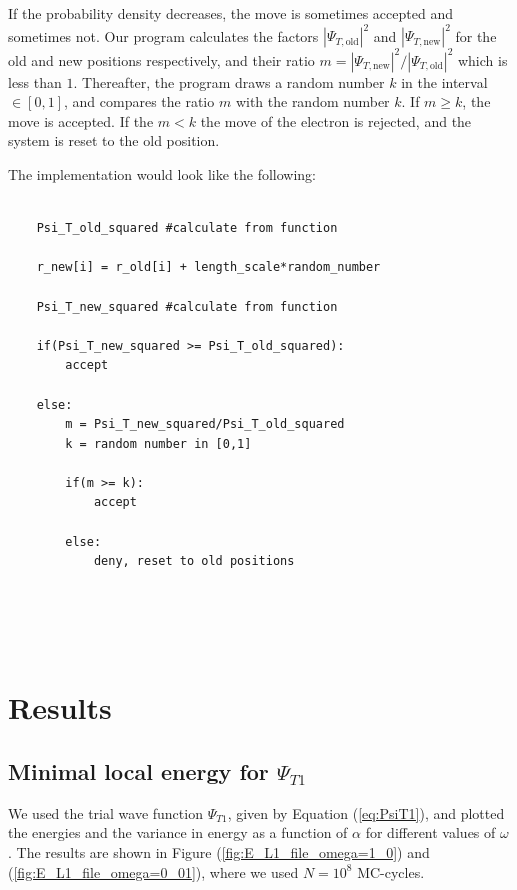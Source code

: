 \documentclass[norsk,a4paper,12pt]{article}
\begin{document}
\par 
\vspace{2mm}

If the probability density decreases, the move is sometimes accepted and sometimes not. Our program calculates the factors $|\Psi_{T,\text{old}}|^2$ and $|\Psi_{T, \text{new}}|^2$ for the old and new positions respectively, and their ratio $ m = |\Psi_{T,\text{new}}|^2/|\Psi_{T,\text{old}}|^2$ which is less than $1$. Thereafter, the program draws a random number $k$ in the interval $\in [0, 1]$, and compares the ratio $m$ with the random number $k$. If $m \geq k$, the move is accepted. If the $m < k$ the move of the electron is rejected, and the system is reset to the old position. 

\par 
\vspace{3mm}

The implementation would look like the following:

\begin{lstlisting}
    
    Psi_T_old_squared #calculate from function
    
    r_new[i] = r_old[i] + length_scale*random_number
    
    Psi_T_new_squared #calculate from function
    
    if(Psi_T_new_squared >= Psi_T_old_squared):
        accept
    
    else:
        m = Psi_T_new_squared/Psi_T_old_squared
        k = random number in [0,1]
        
        if(m >= k):
            accept
            
        else:
            deny, reset to old positions
    
    
    
    
\end{lstlisting}

\section{Results} \label{Results}
\subsection{Minimal local energy for $\Psi_{T1}$}

We used the trial wave function $\Psi_{T1}$, given by Equation (\ref{eq:PsiT1}), and plotted the energies and the variance in energy as a function of $\alpha$ for different values of $\omega$. The results are shown in Figure (\ref{fig:E_L1_file_omega=1_0}) and (\ref{fig:E_L1_file_omega=0_01}), where we used $N=10^8$ MC-cycles.
\end{document}
